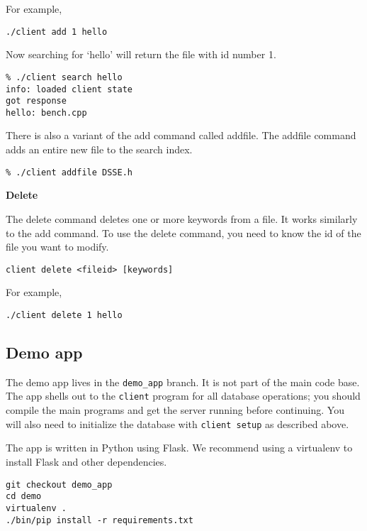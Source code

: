 For example,

\begin{lstlisting}
./client add 1 hello
\end{lstlisting}

Now searching for `hello' will return the file with id number 1.

\begin{lstlisting}
% ./client search hello
info: loaded client state
got response
hello: bench.cpp
\end{lstlisting}

There is also a variant of the add command called addfile.
The addfile command adds an entire new file to the search index.

\begin{lstlisting}
% ./client addfile DSSE.h
\end{lstlisting}

\noindent\textbf{Delete}

The delete command deletes one or more keywords from a file.
It works similarly to the add command.
To use the delete command, you need to know the id of the file you want to modify.

\begin{lstlisting}
client delete <fileid> [keywords]
\end{lstlisting}

For example,

\begin{lstlisting}
./client delete 1 hello
\end{lstlisting}

\subsection{Demo app}

The demo app lives in the \texttt{demo\_app} branch.
It is not part of the main code base.
The app shells out to the \texttt{client} program for all database operations;
you should compile the main programs and get the server running before continuing.
You will also need to initialize the database with \texttt{client setup} as described above.

The app is written in Python using Flask.
We recommend using a virtualenv to install Flask and other dependencies.

\begin{lstlisting}
git checkout demo_app
cd demo
virtualenv .
./bin/pip install -r requirements.txt
\end{lstlisting}

